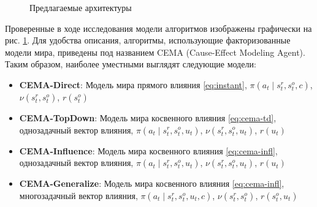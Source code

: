 \begin{figure}[t]%
    \centering
    \scalebox{0.75}{
        
    }
    \scalebox{0.75}{
        
    }
    \scalebox{0.75}{
        
    }
    \scalebox{0.75}{
        
    }
    \caption{Предлагаемые архитектуры}
    \label{fig:archs}
\end{figure}

Проверенные в ходе исследования модели алгоритмов изображены графически на рис. \ref{fig:archs}.
Для удобства описания, алгоритмы, использующие факторизованные модели мира, приведены под названием CEMA (Cause-Effect Modeling Agent).
Таким образом, наиболее уместными выглядят следующие модели:
\begin{itemize}
    \item \textbf{CEMA-Direct}: Модель мира прямого влияния \ref{eq:instant}, $\pi(a_t \mid s^r_t, s^o_t, c)$, $\nu(s^r_t, s^o_t)$, $r(s^o_t)$
    \item \textbf{CEMA-TopDown}: Модель мира косвенного влияния \ref{eq:cema-td}, однозадачный вектор влияния, $\pi(a_t \mid s^r_t, s^o_t, u_t)$, $\nu(s^r_t, s^o_t, u_t)$, $r(u_t)$
    \item \textbf{CEMA-Influence}: Модель мира косвенного влияния \ref{eq:cema-infl}, однозадачный вектор влияния, $\pi(a_t \mid s^r_t, s^o_t, u_t)$, $\nu(s^r_t, s^o_t, u_t)$, $r(u_t)$
    \item \textbf{CEMA-Generalize}: Модель мира косвенного влияния \ref{eq:cema-infl}, многозадачный вектор влияния, $\pi(a_t \mid s^r_t, s^o_t, u_t, c)$, $\nu(s^r_t, s^o_t)$, $r(s^o_t, u_t)$ 
\end{itemize}


